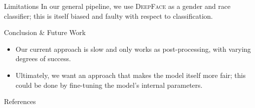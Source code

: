 \documentclass[final]{beamer}
\newlength{\onecolwid}
\begin{document}
\begin{frame}[t]
\begin{columns}[t]
\begin{column}{\onecolwid}
\begin{block}{Limitations}
In our general pipeline, we use \textsc{DeepFace} as a gender and race classifier; this is itself biased and faulty with respect to classification. 

\end{block}

\begin{block}{Conclusion \& Future Work}
\begin{itemize}
    \item Our current approach is slow and only works as post-processing, with varying degrees of success.
    \item Ultimately, we want an approach that makes the model itself more fair; this could be done by fine-tuning the model's internal parameters.
\end{itemize}


\end{block}





\begin{block}{References}
\printbibliography
\end{block}










\end{column}
\end{columns}
\end{frame}
\end{document}
